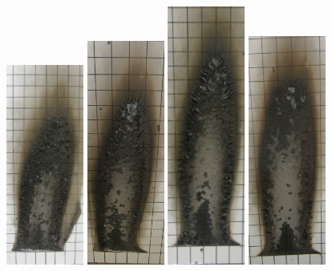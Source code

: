 \documentclass[twoside]{uocthesis}
\begin{document}
\begin{figure}[p]
	\includegraphics[width=1.0in]{../Figures/GBNG1_P5120006}
	\includegraphics[width=1.0in]{../Figures/GBNG2_P5120024}
	\includegraphics[width=1.0in]{../Figures/GBNG3_P5120048}
	\includegraphics[width=1.0in]{../Figures/GBNG4_P5120086}

\end{figure}
\end{document}
